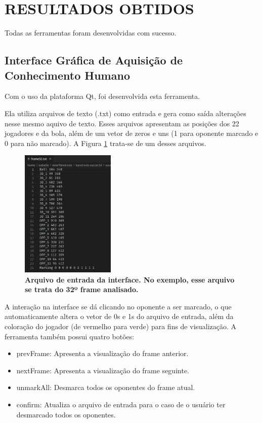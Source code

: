 \documentclass[10pt,fleqn,a4paper]{article}
\begin{document}
    \section{RESULTADOS OBTIDOS}
    
    Todas as ferramentas foram desenvolvidas com sucesso.
    
    \subsection{Interface Gráfica de Aquisição de Conhecimento Humano}
    
    Com o uso da plataforma Qt, foi desenvolvida esta ferramenta.
    
    Ela utiliza arquivos de texto (.txt) como entrada e gera como saída alterações nesse mesmo aquivo de texto. Esses arquivos apresentam as posições dos 22 jogadores e da bola, além de um vetor de zeros e uns (1 para oponente marcado e 0 para não marcado). A Figura \ref{fig:arquivo-de-entrada} trata-se de um desses arquivos.
    
\begin{figure}[H]
\centering
\includegraphics[width=0.4\textwidth]{figures/arquivo-de-entrada.png}
\caption{\textbf{Arquivo de entrada da interface. No exemplo, esse arquivo se trata do 32º frame analisado.}} \label{fig:arquivo-de-entrada}
\end{figure}
    
    A interação na interface se dá clicando no oponente a ser marcado, o que automaticamente altera o vetor de 0s e 1s do arquivo de entrada, além da coloração do jogador (de vermelho para verde) para fins de visualização. A ferramenta também possui quatro botões:
    
\begin{itemize}
\item prevFrame: Apresenta a visualização do frame anterior.
\item nextFrame: Apresenta a visualização do frame seguinte.
\item unmarkAll: Desmarca todos os oponentes do frame atual.
\item confirm: Atualiza o arquivo de entrada para o caso de o usuário ter desmarcado todos os oponentes.
\end{itemize}
\end{document}
